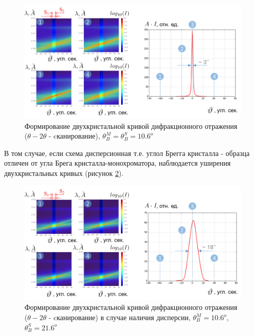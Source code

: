  \begin{figure}[H]
   \centering
   \includegraphics[width=1\textwidth]{images/double_crystal_form_kdo.png}
   \caption{Формирование двухкристальной кривой дифракционного отражения ($\theta - 2\theta$ - cканирование),
   $\theta_B^M = \theta_B^S = 10.6^o$  }
   \label{ris:double_crystal_form_kdo}
 \end{figure}

В том случае, если схема дисперсионная т.е. углол Брегга кристалла - образца отличен от угла Брега кристалла-монохроматора,
наблюдается уширения двухкристальных кривых (рисунок \ref{ris:double_crystal_form_kdo_dissp}).
 \begin{figure}[H]
   \centering
   \includegraphics[width=1\textwidth]{images/double_crystal_form_kdo_dissp.png}
   \caption{Формирование двухкристальной кривой дифракционного отражения ($\theta - 2\theta$ - cканирование) в случае
   наличия дисперсии, $\theta_B^M = 10.6^o$, $\theta_B^S = 21.6^o$ }
   \label{ris:double_crystal_form_kdo_dissp}
 \end{figure}
